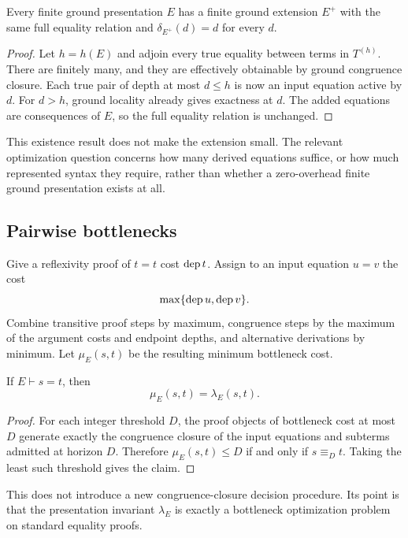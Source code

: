 \begin{proposition}\label{prop:flattening}
Every finite ground presentation $E$ has a finite ground extension $E^+$
with the same full equality relation and
$\delta_{E^+}(d)=d$ for every $d$.
\end{proposition}
\begin{proof}
Let $h=h(E)$ and adjoin every true equality between terms in $T^{(h)}$.
There are finitely many, and they are effectively obtainable by ground
congruence closure. Each true pair of depth at most $d\le h$ is now an
input equation active by $d$. For $d>h$, ground locality already gives
exactness at $d$. The added equations are consequences of $E$, so the full
equality relation is unchanged.
\end{proof}

This existence result does not make the extension small. The relevant
optimization question concerns how many derived equations suffice, or how
much represented syntax they require, rather than whether a zero-overhead
finite ground presentation exists at all.

\subsection{Pairwise bottlenecks}

Give a reflexivity proof of $t=t$ cost $\operatorname{dep} t$. Assign to an input equation $u=v$ the cost
\[
\max\{\operatorname{dep} u,\operatorname{dep} v\}.
\]
Combine transitive proof steps by maximum, congruence steps by the maximum of the argument costs and endpoint depths, and alternative derivations by minimum.  Let $\mu_E(s,t)$ be the resulting minimum bottleneck cost.

\begin{proposition}\label{prop:bottleneck}
If $E\vdash s=t$, then
\[
\boxed{\mu_E(s,t)=\lambda_E(s,t)}.
\]
\end{proposition}

\begin{proof}
For each integer threshold $D$, the proof objects of bottleneck cost at most $D$ generate exactly the congruence closure of the input equations and subterms admitted at horizon $D$.  Therefore $\mu_E(s,t)\le D$ if and only if $s\equiv_D t$.  Taking the least such threshold gives the claim.
\end{proof}

This does not introduce a new congruence-closure decision procedure.  Its point is that the presentation invariant $\lambda_E$ is exactly a bottleneck optimization problem on standard equality proofs.

